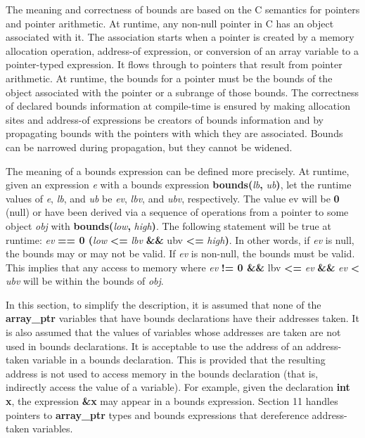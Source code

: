 \documentclass[]{article}
\begin{document}
The meaning and correctness of bounds are based on the C semantics for
pointers and pointer arithmetic. At runtime, any non-null pointer in C
has an object associated with it. The association starts when a pointer
is created by a memory allocation operation, address-of expression, or
conversion of an array variable to a pointer-typed expression. It flows
through to pointers that result from pointer arithmetic. At runtime, the
bounds for a pointer must be the bounds of the object associated with
the pointer or a subrange of those bounds. The correctness of declared
bounds information at compile-time is ensured by making allocation sites
and address-of expressions be creators of bounds information and by
propagating bounds with the pointers with which they are associated.
Bounds can be narrowed during propagation, but they cannot be widened.

The meaning of a bounds expression can be defined more precisely. At
runtime, given an expression \emph{e} with a bounds expression
\textbf{bounds(}\emph{lb}\textbf{,} \emph{ub}\textbf{)}, let the runtime
values of \emph{e}, \emph{lb}, and \emph{ub} be \emph{ev}, \emph{lbv},
and \emph{ubv}, respectively. The value ev will be \textbf{0} (null) or
have been derived via a sequence of operations from a pointer to some
object \emph{obj} with \textbf{bounds(}\emph{low}\textbf{,}
\emph{high}\textbf{)}. The following statement will be true at runtime:
\emph{ev} \textbf{== 0 \textbar{}\textbar{} (}\emph{low}
\textbf{\textless{}=} \emph{lbv} \textbf{\&\&} ubv \textbf{\textless{}=}
\emph{high}\textbf{)}. In other words, if \emph{ev} is null, the bounds
may or may not be valid. If \emph{ev} is non-null, the bounds must be
valid. This implies that any access to memory where \emph{ev} \textbf{!=
0 \&\&} lbv \textbf{\textless{}=} \emph{ev} \textbf{\&\&} \emph{ev}
\textbf{\textless{}} \emph{ubv} will be within the bounds of \emph{obj}.

In this section, to simplify the description, it is assumed that none of
the \textbf{array\_ptr} variables that have bounds declarations have
their addresses taken. It is also assumed that the values of variables
whose addresses are taken are not used in bounds declarations. It is
acceptable to use the address of an address-taken variable in a bounds
declaration. This is provided that the resulting address is not used to
access memory in the bounds declaration (that is, indirectly access the
value of a variable). For example, given the declaration \textbf{int x},
the expression \textbf{\&x} may appear in a bounds expression. Section
11 handles pointers to \textbf{array\_ptr} types and bounds expressions
that dereference address-taken variables.
\end{document}

